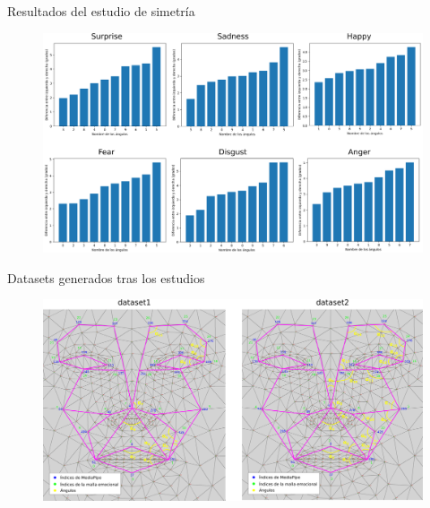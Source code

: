 \documentclass{beamer}
\begin{document}
\begin{frame}{Resultados del estudio de simetría}
\begin{figure}[h!]
\includegraphics[width=12cm]{figs/resultados_simetria.png}
\end{figure}
\end{frame}

\begin{frame}{Datasets generados tras los estudios}

\begin{figure}[h!]
  \begin{center}
  \includegraphics[width=12cm]{figs/datasets_generados.png}
  \end{center}
\end{figure}

\end{frame}
\end{document}
